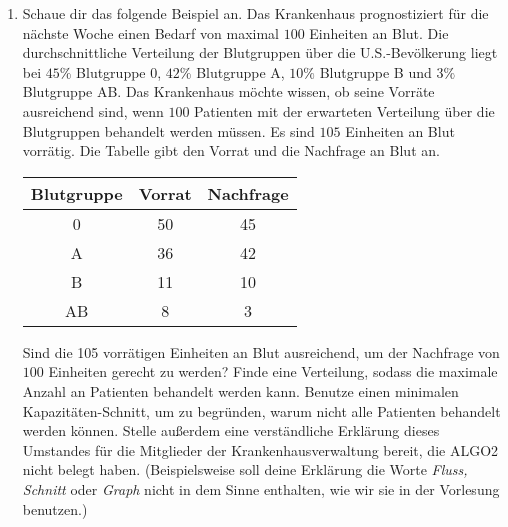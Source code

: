 \documentclass{uebung_cs}
\begin{document}
\begin{aufgabe}[Blutspende]
\begin{enumerate}
    	\item Schaue dir das folgende Beispiel an. Das Krankenhaus prognostiziert für die nächste Woche einen Bedarf von maximal $100$ Einheiten an Blut. Die durchschnittliche Verteilung der Blutgruppen über die U.S.-Bevölkerung liegt bei $45\%$ Blutgruppe 0, $42\%$ Blutgruppe A, $10\%$ Blutgruppe B und $3\%$ Blutgruppe AB. Das Krankenhaus möchte wissen, ob seine Vorräte ausreichend sind, wenn $100$ Patienten mit der erwarteten Verteilung über die Blutgruppen behandelt werden müssen. Es sind $105$ Einheiten an Blut vorrätig. Die Tabelle gibt den Vorrat und die Nachfrage an Blut an.
    	
    	\vspace{4mm}
    	\begin{center}
    	\begin{tabular}{|c|c|c|}
    	\hline 
    	Blutgruppe & Vorrat & Nachfrage \\ 
    	\hline 
    	0 & 50 & 45 \\ 
    	\hline 
    	A & 36 & 42 \\ 
    	\hline 
    	B & 11 & 10 \\ 
    	\hline 
    	AB & 8 & 3 \\ 
    	\hline 
    	\end{tabular}
    	\end{center}
    	\vspace{4mm}
    	Sind die 105 vorrätigen Einheiten an Blut ausreichend, um der Nachfrage von $100$ Einheiten gerecht zu werden? Finde eine Verteilung, sodass die maximale Anzahl an Patienten behandelt werden kann. Benutze einen minimalen Kapazitäten-Schnitt, um zu begründen, warum nicht alle Patienten behandelt werden können. Stelle außerdem eine verständliche Erklärung dieses Umstandes für die Mitglieder der Krankenhausverwaltung bereit, die ALGO2 nicht belegt haben. (Beispielsweise soll deine Erklärung die Worte \textit{Fluss, Schnitt} oder \textit{Graph} nicht in dem Sinne enthalten, wie wir sie in der Vorlesung benutzen.)
    \end{enumerate}
\end{aufgabe}
\end{document}
